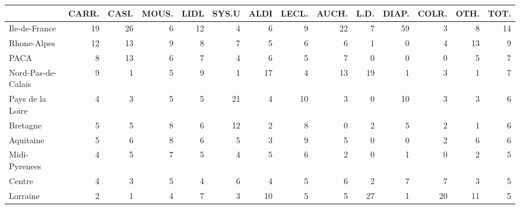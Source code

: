 \documentclass[11pt]{article}
\begin{document}
\begin{table}[H]
\begin{tabular}{lrrrrrrrrrrrrr}
\toprule
\toprule
{} &      CARR. &      CASI. &      MOUS. &       LIDL &      SYS.U &       ALDI &      LECL. &      AUCH. &       L.D. &      DIAP. &      COLR. &       OTH. &       TOT. \\
\midrule
Ile-de-France        &         19 &         26 &          6 &         12 &          4 &          6 &          9 &         22 &          7 &         59 &          3 &          8 &         14 \\
Rhone-Alpes          &         12 &         13 &          9 &          8 &          7 &          5 &          6 &          6 &          1 &          0 &          4 &         13 &          9 \\
PACA                 &          8 &         13 &          6 &          7 &          4 &          6 &          5 &          7 &          0 &          0 &          0 &          5 &          7 \\
Nord-Pas-de-Calais   &          9 &          1 &          5 &          9 &          1 &         17 &          4 &         13 &         19 &          1 &          3 &          1 &          7 \\
Pays de la Loire     &          4 &          3 &          5 &          5 &         21 &          4 &         10 &          3 &          0 &         10 &          3 &          3 &          6 \\
Bretagne             &          5 &          5 &          8 &          6 &         12 &          2 &          8 &          0 &          2 &          5 &          2 &          1 &          6 \\
Aquitaine            &          5 &          6 &          8 &          6 &          5 &          3 &          9 &          5 &          0 &          0 &          2 &          6 &          6 \\
Midi-Pyrenees        &          4 &          5 &          7 &          5 &          4 &          5 &          6 &          2 &          0 &          1 &          0 &          2 &          5 \\
Centre               &          4 &          3 &          5 &          4 &          6 &          4 &          5 &          6 &          2 &          7 &          7 &          3 &          5 \\
Lorraine             &          2 &          1 &          4 &          7 &          3 &         10 &          5 &          5 &         27 &          1 &         20 &         11 &          5 \\

\end{tabular}
\end{table}
\end{document}
